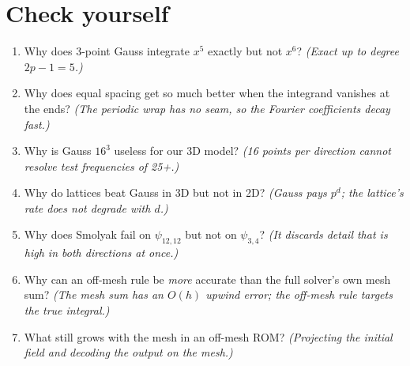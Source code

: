 \documentclass[11pt]{article}
\begin{document}
\section*{Check yourself}
\begin{enumerate}
\item Why does 3-point Gauss integrate $x^5$ exactly but not $x^6$? \emph{(Exact up to degree $2p-1=5$.)}
\item Why does equal spacing get so much better when the integrand vanishes at the ends? \emph{(The periodic wrap has no
seam, so the Fourier coefficients decay fast.)}
\item Why is Gauss $16^3$ useless for our 3D model? \emph{(16 points per direction cannot resolve test frequencies of 25+.)}
\item Why do lattices beat Gauss in 3D but not in 2D? \emph{(Gauss pays $p^d$; the lattice's rate does not degrade with $d$.)}
\item Why does Smolyak fail on $\psi_{12,12}$ but not on $\psi_{3,4}$? \emph{(It discards detail that is high in both directions at once.)}
\item Why can an off-mesh rule be \emph{more} accurate than the full solver's own mesh sum? \emph{(The mesh sum has an
$O(h)$ upwind error; the off-mesh rule targets the true integral.)}
\item What still grows with the mesh in an off-mesh ROM? \emph{(Projecting the initial field and decoding the output on the mesh.)}
\end{enumerate}
\end{document}
